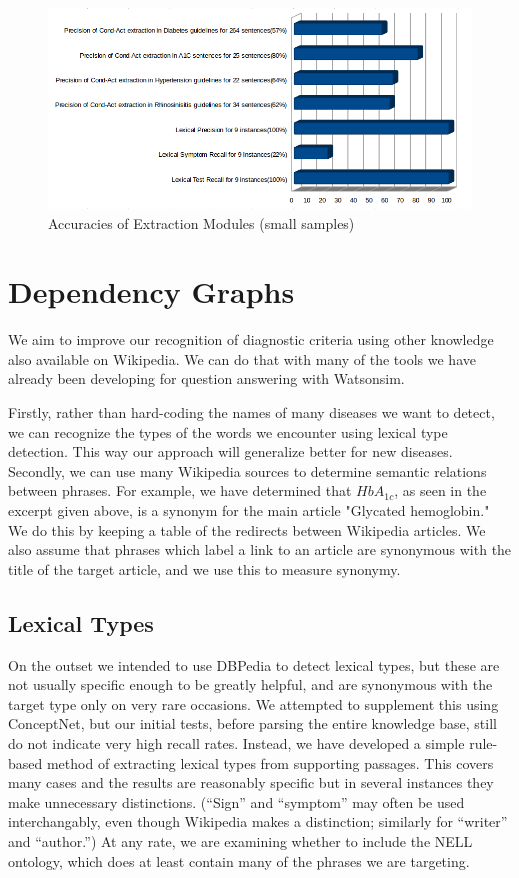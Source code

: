 \documentclass[12pt,letterpaper]{article}
\begin{document}
\begin{figure}
\includegraphics[width=\textwidth]{accuracies}
\caption{Accuracies of Extraction Modules (small samples)}
\end{figure}

\section{Dependency Graphs}
We aim to improve our recognition of diagnostic criteria using other knowledge also available on Wikipedia. We can do that with many of the tools we have already been developing for question answering with Watsonsim.

Firstly, rather than hard-coding the names of many diseases we want to detect, we can recognize the types of the words we encounter using lexical type detection. This way our approach will generalize better for new diseases.
Secondly, we can use many Wikipedia sources to determine semantic relations between phrases. For example, we have determined that $HbA_{1c}$, as seen in the excerpt given above, is a synonym for the main article "Glycated hemoglobin." We do this by keeping a table of the redirects between Wikipedia articles. We also assume that phrases which label a link to an article are synonymous with the title of the target article, and we use this to measure synonymy.

\subsection{Lexical Types}
On the outset we intended to use DBPedia to detect lexical types, but these are not usually specific enough to be greatly helpful, and are synonymous with the target type only on very rare occasions. We attempted to supplement this using ConceptNet, but our initial tests, before parsing the entire knowledge base, still do not indicate very high recall rates. Instead, we have developed a simple rule-based method of extracting lexical types from supporting passages. This covers many cases and the results are reasonably specific but in several instances they make unnecessary distinctions. (``Sign'' and ``symptom'' may often be used interchangably, even though Wikipedia makes a distinction; similarly for ``writer'' and ``author.'') At any rate, we are examining whether to include the NELL ontology, which does at least contain many of the phrases we are targeting.
\end{document}
